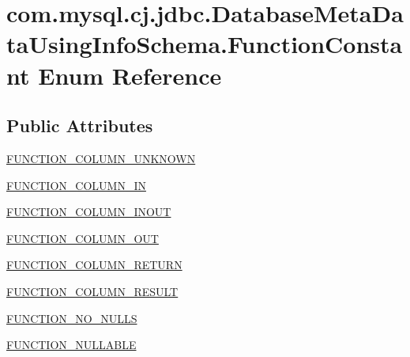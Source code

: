 \hypertarget{enumcom_1_1mysql_1_1cj_1_1jdbc_1_1_database_meta_data_using_info_schema_1_1_function_constant}{}\section{com.\+mysql.\+cj.\+jdbc.\+Database\+Meta\+Data\+Using\+Info\+Schema.\+Function\+Constant Enum Reference}
\label{enumcom_1_1mysql_1_1cj_1_1jdbc_1_1_database_meta_data_using_info_schema_1_1_function_constant}
\subsection*{Public Attributes}
\begin{DoxyCompactItemize}
\item 
\mbox{\hyperlink{enumcom_1_1mysql_1_1cj_1_1jdbc_1_1_database_meta_data_using_info_schema_1_1_function_constant_a03936b305f47e198d7eac4aef9cd439d}{F\+U\+N\+C\+T\+I\+O\+N\+\_\+\+C\+O\+L\+U\+M\+N\+\_\+\+U\+N\+K\+N\+O\+WN}}
\item 
\mbox{\hyperlink{enumcom_1_1mysql_1_1cj_1_1jdbc_1_1_database_meta_data_using_info_schema_1_1_function_constant_aab06ff730eb4d8fd6f9458e33786fa26}{F\+U\+N\+C\+T\+I\+O\+N\+\_\+\+C\+O\+L\+U\+M\+N\+\_\+\+IN}}
\item 
\mbox{\hyperlink{enumcom_1_1mysql_1_1cj_1_1jdbc_1_1_database_meta_data_using_info_schema_1_1_function_constant_adc7e4657efc72b54323c9c832f9493a0}{F\+U\+N\+C\+T\+I\+O\+N\+\_\+\+C\+O\+L\+U\+M\+N\+\_\+\+I\+N\+O\+UT}}
\item 
\mbox{\hyperlink{enumcom_1_1mysql_1_1cj_1_1jdbc_1_1_database_meta_data_using_info_schema_1_1_function_constant_a423eb1130277ddc6d9758ef33948907d}{F\+U\+N\+C\+T\+I\+O\+N\+\_\+\+C\+O\+L\+U\+M\+N\+\_\+\+O\+UT}}
\item 
\mbox{\hyperlink{enumcom_1_1mysql_1_1cj_1_1jdbc_1_1_database_meta_data_using_info_schema_1_1_function_constant_a433484e2e38542ce75cc013e64b3ee81}{F\+U\+N\+C\+T\+I\+O\+N\+\_\+\+C\+O\+L\+U\+M\+N\+\_\+\+R\+E\+T\+U\+RN}}
\item 
\mbox{\hyperlink{enumcom_1_1mysql_1_1cj_1_1jdbc_1_1_database_meta_data_using_info_schema_1_1_function_constant_aad83ccccaf64f8dfab75164848970380}{F\+U\+N\+C\+T\+I\+O\+N\+\_\+\+C\+O\+L\+U\+M\+N\+\_\+\+R\+E\+S\+U\+LT}}
\item 
\mbox{\hyperlink{enumcom_1_1mysql_1_1cj_1_1jdbc_1_1_database_meta_data_using_info_schema_1_1_function_constant_afd9b1db683c023a8a9f32700644c0b55}{F\+U\+N\+C\+T\+I\+O\+N\+\_\+\+N\+O\+\_\+\+N\+U\+L\+LS}}
\item 
\mbox{\hyperlink{enumcom_1_1mysql_1_1cj_1_1jdbc_1_1_database_meta_data_using_info_schema_1_1_function_constant_a84a45e7e2772711a44ced18b9a971855}{F\+U\+N\+C\+T\+I\+O\+N\+\_\+\+N\+U\+L\+L\+A\+B\+LE}}
\end{DoxyCompactItemize}


